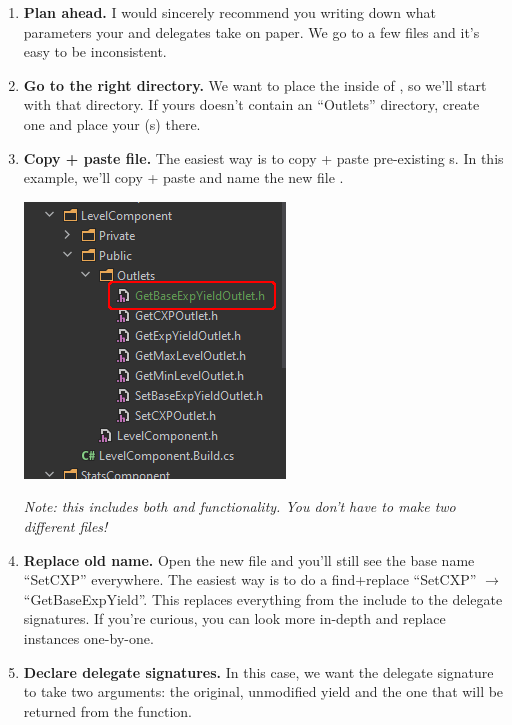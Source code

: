 \begin{enumerate}
	\item{\textbf{Plan ahead.} I would sincerely recommend you writing down what parameters your   and  delegates take on paper. We go to a few files and it's easy to be inconsistent.}
	\item{\textbf{Go to the right directory.} We want to place the  inside of , so we'll start with that directory. If yours doesn't contain an ``Outlets'' directory, create one and place your (s) there.}
	\item{\textbf{Copy + paste file.} The easiest way is to copy + paste pre-existing s. In this example, we'll copy + paste  and name the new file . \\
	\begin{center}
		\includegraphics[scale=\ScreenshotScale]{create-outlet-rename}
	\end{center}
	\noindent \textit{Note: this includes both  and  functionality. You don't have to make two different files!}
	}
	\item{\textbf{Replace old name.} Open the new file and you'll still see the base name ``SetCXP'' everywhere. The easiest way is to do a find+replace ``SetCXP'' $\rightarrow$ ``GetBaseExpYield''. This replaces everything from the  include to the delegate signatures. If you're curious, you can look more in-depth and replace instances one-by-one.}
	\item{\textbf{Declare delegate signatures.} In this case, we want the  delegate signature to take two arguments: the original, unmodified yield and the one that will be returned from the  function.\\
}
\end{enumerate}
